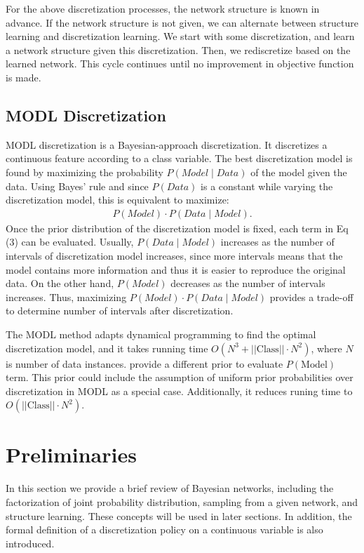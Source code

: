 {For the above discretization processes, the network structure is known in advance. If the network structure is not given, we can alternate between structure learning and discretization learning. We start with some discretization, and learn a network structure given this discretization. Then, we rediscretize based on the learned network. This cycle continues until no improvement in objective function is made.
\subsection{MODL Discretization}
\label{MODL}
MODL discretization \citep{Boulle_2006} is a Bayesian-approach discretization. It discretizes a continuous feature according to a class variable. The best discretization model is found by maximizing the probability $P(\textit{Model} \mid \textit{Data})$ of the model given the data. Using Bayes' rule and since $P(\textit{Data})$ is a constant while varying the discretization model, this is equivalent to maximize:
\begin{align}
P(\textit{Model}) \cdot P(\textit{Data} \mid \textit{Model}).
\end{align}
Once the prior distribution of the discretization model is fixed, each term in Eq (3) can be evaluated. Usually, $P(\textit{Data} \mid \textit{Model})$ increases as the number of intervals of discretization model increases, since more intervals means that the model contains more information and thus it is easier to reproduce the original data. On the other hand, $P(\textit{Model})$ decreases as the number of intervals increases. Thus, maximizing $P(\textit{Model}) \cdot P(\textit{Data} \mid \textit{Model})$ provides a trade-off to determine number of intervals after discretization.

The MODL method adapts dynamical programming to find the optimal discretization model, and it takes running time $O(N^3 + ||\text{Class}|| \cdot N^2)$, where $N$ is number of data instances. \cite{Lustgarten_2011} provide a different prior to evaluate $P(\text{Model})$ term. This prior could include the assumption of uniform prior probabilities over discretization in MODL as a special case. Additionally, it reduces runing time to $O(||\text{Class}|| \cdot N^2)$.


\section{Preliminaries}
\label{Prelim_Notation}
In this section we provide a brief review of Bayesian networks, including the factorization of joint probability distribution, sampling from a given network, and structure learning. These concepts will be used in later sections. In addition, the formal definition of a discretization policy on a continuous variable is also introduced.

}
